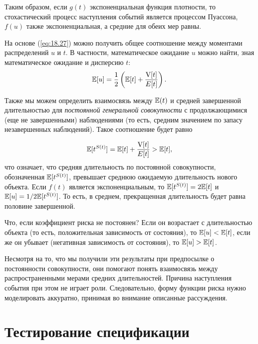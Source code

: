 Таким образом, если $g(t)$ экспоненциальная функция плотности, то стохастический процесс наступления событий является процессом Пуассона, $f(u)$ также экспоненциальная, а средние для обеих мер равны.

На основе (\ref{eq:18.27}) можно получить общее соотношение между моментами распределений $u$ и $t$. В частности, математическое ожидание $u$ можно найти, зная математическое ожидание и дисперсию $t$:
    \begin{align}
        \label{eq:18.28}
        \mathbb{E}[u] = \frac{1}{2}\left( \mathbb{E}[t] + \frac{\mathrm{V}[t]}{E[t]} \right).
    \end{align}

Также мы можем определить взаимосвязь между $\mathbb{E}(t)$ и средней завершенной длительностью для \textit{постоянной генеральной совокупности} с продолжающимися (еще не завершенными) наблюдениями (то есть, средним значением по запасу незавершенных наблюдений). Такое соотношение будет равно %

    \begin{align}
        \label{eq:18.29}
        \mathbb{E}[t^{S(t)}] = \mathbb{E}[t] + \frac{\mathrm{V}[t]}{E[t]} > \mathbb{E}[t],
    \end{align}
что означает, что средняя длительность по постоянной совокупности, обозначенная $\mathbb{E}[t^{S(t)}]$, превышает среднюю ожидаемую длительность нового объекта. Если $f(t)$ является экспоненциальным, то $\mathbb{E}[t^{S(t)}] = 2 \mathbb{E}[t]$ и $\mathbb{E}[u] = 1/2\mathbb{E}[t^{S(t)}]$. То есть, в среднем, прекращенная длительность будет равна половине завершенной.

Что, если коэффициент риска не постоянен? Если он возрастает с длительностью объекта (то есть, положительная зависимость от состояния), то $\mathbb{E}[u] < \mathbb{E}[t]$, если же он убывает (негативная зависимость от состояния), то $\mathbb{E}[u] > \mathbb{E}[t]$.

Несмотря на то, что мы получили эти результаты при предпосылке о постоянности совокупности, они помогают понять взаимосвязь между распространенными мерами средних длительностей. Причина наступления события при этом не играет роли. Следовательно, форму функции риска нужно моделировать аккуратно, принимая во внимание описанные рассуждения.




\section{Тестирование спецификации}\label{sec:18.7}

